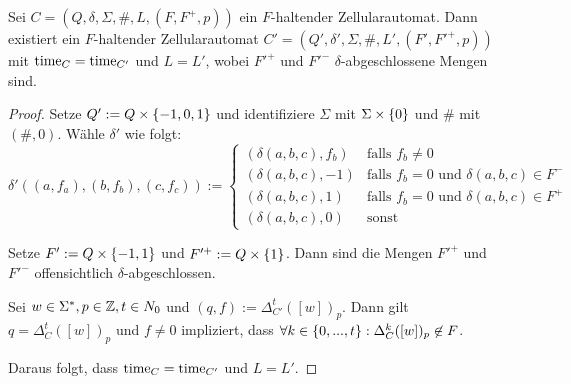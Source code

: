 \begin{lemma}
    \label{lemmaAbgeschlosseneMenge}
    
    Sei $C = (Q, \delta, \Sigma, \#, L, (F, F^+, p))$ ein $F$-haltender Zellularautomat.
    Dann existiert ein $F$-haltender Zellularautomat $C' = (Q', \delta', \Sigma, \#, L', (F', F'^+, p))$ mit $\operatorname{time}_{C} = \operatorname{time}_{C'}$ und $L = L'$,
    wobei $F'^+$ und $F'^-$ $\delta$-abgeschlossene Mengen sind.
\end{lemma}
\begin{proof}
    Setze $Q' := Q \times \{ {{-1}, 0, 1} \}$ und identifiziere $\Sigma$ mit $\Sigma \times \{ {0} \}$ und $\#$ mit $(\#, 0)$.
    Wähle $\delta'$ wie folgt:
    \[
       \delta'((a, f_a), (b, f_b), (c, f_c)) :=
       \begin{cases}
         (\delta(a, b, c), f_b)  & \text{falls } f_b \neq 0 \\
         (\delta(a, b, c), {-1}) & \text{falls } f_b = 0 \text{ und } \delta(a, b, c) \in F^- \\
         (\delta(a, b, c), {1}) & \text{falls } f_b = 0 \text{ und }  \delta(a, b, c) \in F^+ \\
         (\delta(a, b, c), {0}) & \text{sonst}
       \end{cases}
    \]
    
    Setze $F' := Q \times \{ {{-1}, 1} \}$ und $F'^+ := Q \times \{ {1} \}$.
    Dann sind die Mengen $F'^+$ und $F'^-$ offensichtlich $\delta$-abgeschlossen.
    
    Sei $w \in \Sigma^*, p \in \mathbb{Z}, t \in N_0$ und $(q, f) := \Delta_{C'}^t([w])_p$.
    Dann gilt $q = \Delta_{C}^t([w])_p$ und $f \neq 0$ impliziert, dass $\forall k \in \{ { 0, ..., t } \}: \Delta_{C}^k([w])_p \not\in F$.
    
    Daraus folgt, dass $\operatorname{time}_{C} = \operatorname{time}_{C'}$ und $L = L'$.
\end{proof}



